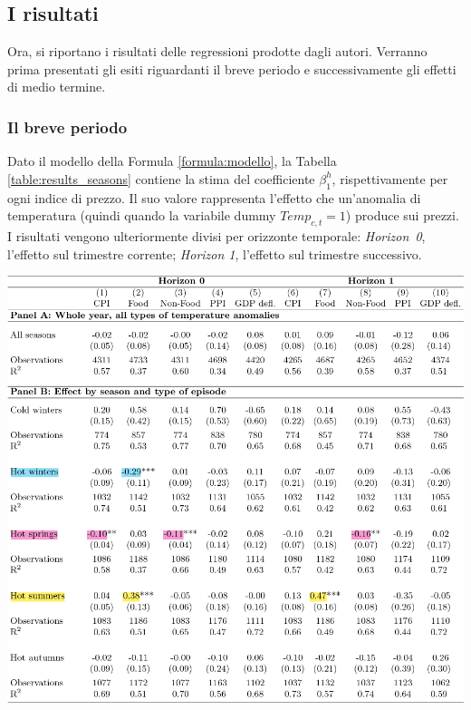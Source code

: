 \subsection{I risultati}

Ora, si riportano i risultati delle regressioni prodotte dagli autori. Verranno prima presentati gli esiti riguardanti il breve periodo e successivamente gli effetti di medio termine.

\subsubsection{Il breve periodo}
Dato il modello della Formula \ref{formula:modello}, la Tabella \ref{table:results_seasons} contiene la stima del coefficiente $\beta^{h}_{1}$, rispettivamente per ogni indice di prezzo. Il suo valore rappresenta l'effetto che un'anomalia di temperatura (quindi quando la variabile dummy $Temp_{c,t} = 1$) produce sui prezzi. I risultati vengono ulteriormente divisi per orizzonte temporale: \textit{Horizon~0}, l'effetto sul trimestre corrente; \textit{Horizon 1}, l'effetto sul trimestre successivo.

\begin{table}[H]
	\centering
	\includegraphics[width=\textwidth]{img/results_seasonss.pdf}
	\caption{}
	\label{table:results_seasons}
\end{table}

